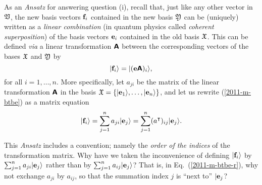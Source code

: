 As an {\it Ansatz} for answering question (i), recall that, just like any other vector in ${\frak V}$,
the new basis vectors ${\bf f}_i$ contained in the new basis ${\frak Y}$
can be (uniquely) written as a {\em linear combination}
(in quantum physics called {\em coherent superposition})
of the basis vectors
${\bf e}_i$ contained in the old  basis ${\frak X}$.
This can be defined {\it via}
a linear transformation $\textsf{\textbf{A}}$ between the corresponding vectors of the bases
 ${\frak X}$ and
${\frak Y}$ by~\cite[\S~46]{halmos-vs}
\begin{equation}
\vert {\bf f}_i \rangle = \vert ({\bf e}\textsf{\textbf{A}})_i \rangle
,
\label{2011-m-btbe}
\end{equation}
for all $i=1, \ldots , n$.
%
More specifically, let ${a}_{ji}$ be the matrix of the linear transformation $\textsf{\textbf{A}}$
in the basis
${\frak X}
=
\{
\vert {\bf e}_1 \rangle ,
\ldots ,
\vert {\bf e}_n \rangle
\}$,
and let us rewrite (\ref{2011-m-btbe}) as a matrix equation
\begin{equation}
\vert {\bf f}_i\rangle = \sum_{j=1}^n a_{ji}\vert  {\bf e}_j \rangle  = \sum_{j=1}^n (a^\intercal )_{ij} \vert {\bf e}_j   \rangle
.
\label{2011-m-btbe-r}
\end{equation}


This {\it Ansatz} includes a convention; namely  the {\em order of the indices} of the transformation matrix.
Why have we taken the inconvenience of defining
$\vert {\bf f}_i\rangle $ by $\sum_{j=1}^n a_{ji} \vert {\bf e}_j\rangle $ rather than by $\sum_{j=1}^n a_{ij}\vert  {\bf e}_j\rangle $?
That is, in  Eq.~(\ref{2011-m-btbe-r}), why not exchange $a_{ji}$ by $a_{ij}$,
so that the summation index $j$ is ``next to'' $\vert {\bf e}_j$?

